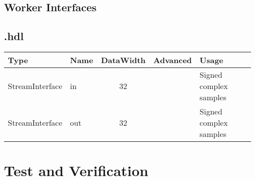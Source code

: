 \begin{landscape}
	\section*{Worker Interfaces}
	\subsection*{\comp.hdl}
	\begin{scriptsize}
		\begin{tabular}{|M{2cm}|M{1.5cm}|c|c|M{12cm}|}
			\hline
			Type            & Name & DataWidth & Advanced  & Usage                  \\
			\hline
			StreamInterface & in   & 32        & 			& Signed complex samples \\
			\hline
			StreamInterface & out  & 32        & 			& Signed complex samples \\
			\hline
		\end{tabular}
	\end{scriptsize}
\end{landscape}


\section*{Test and Verification}


